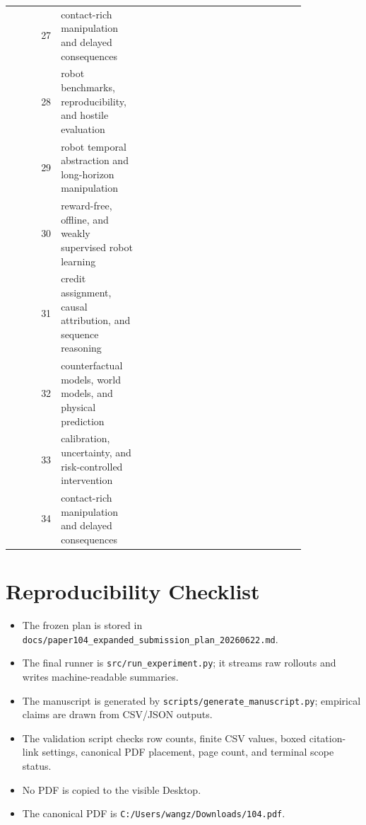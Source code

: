 \documentclass{article}
\begin{document}
\begin{longtable}{@{}r p{0.28\linewidth} p{0.55\linewidth}@{}}
27 & contact-rich manipulation and delayed consequences & \citep{knauer2026irosa79,kim2026humanoid80,acs2026raes81} \\
28 & robot benchmarks, reproducibility, and hostile evaluation & \citep{cao2023iterative82,boulet2024robot83,malekzadeh2013skills84} \\
29 & robot temporal abstraction and long-horizon manipulation & \citep{anwar2025remembr85,zhang2017skill86,yang2017interface87} \\
30 & reward-free, offline, and weakly supervised robot learning & \citep{matheus2025longterm88,singh2019endtoend89,regmi2022humans90} \\
31 & credit assignment, causal attribution, and sequence reasoning & \citep{ison2015highdensity91,zhou2026offline92,nan2025robot93} \\
32 & counterfactual models, world models, and physical prediction & \citep{huang2025automated94,wang2026bidirectional95,balakuntala2021learning96} \\
33 & calibration, uncertainty, and risk-controlled intervention & \citep{guclu2026weakly97,duarte2015effects98,wang2025dynamic99} \\
34 & contact-rich manipulation and delayed consequences & \citep{zhou2026gentle100,wang2025reward101,okita2013the102} \\
\bottomrule
\end{longtable}

\section{Reproducibility Checklist}
\begin{itemize}
\item The frozen plan is stored in \texttt{docs/paper104\_expanded\_submission\_plan\_20260622.md}.
\item The final runner is \texttt{src/run\_experiment.py}; it streams raw rollouts and writes machine-readable summaries.
\item The manuscript is generated by \texttt{scripts/generate\_manuscript.py}; empirical claims are drawn from CSV/JSON outputs.
\item The validation script checks row counts, finite CSV values, boxed citation-link settings, canonical PDF placement, page count, and terminal scope status.
\item No PDF is copied to the visible Desktop.
\item The canonical PDF is \texttt{C:/Users/wangz/Downloads/104.pdf}.
\end{itemize}
\end{document}
